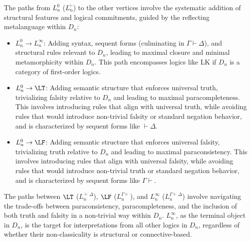 \begin{remark}
																																																																														The paths from $L^0_n$ ($L^{\vdash}_n$) to the other vertices involve the systematic addition of structural features and logical commitments, guided by the reflecting metalanguage within $D_n$:
																																																																														\begin{itemize}
																																																																															\item $L^0_n \to L^\infty_n$: Adding syntax, sequent forms (culminating in $\Gamma \vdash \Delta$), and structural rules relevant to $D_n$, leading to maximal closure and minimal metamorphicity within $D_n$. This path encompasses logics like LK if $D_n$ is a category of first-order logics.
																																																																															\item $L^0_n \to \LT$: Adding semantic structure that enforces universal truth, trivializing falsity relative to $D_n$ and leading to maximal paracompleteness. This involves introducing rules that align with universal truth, while avoiding rules that would introduce non-trivial falsity or standard negation behavior, and is characterized by sequent forms like $\vdash \Delta$.
																																																																															\item $L^0_n \to \LF$: Adding semantic structure that enforces universal falsity, trivializing truth relative to $D_n$ and leading to maximal paraconsistency. This involves introducing rules that align with universal falsity, while avoiding rules that would introduce non-trivial truth or standard negation behavior, and is characterized by sequent forms like $\Gamma \vdash$.
																																																																															\end{itemize}
																																																																																The paths between $\LT$ ($L^{\vdash\Delta}_n$), $\LF$ ($L^{\Gamma\vdash}_n$), and $L^\infty_n$ ($L^{\Gamma\vdash\Delta}_n$) involve navigating the trade-offs between paraconsistency, paracompleteness, and the inclusion of both truth and falsity in a non-trivial way within $D_n$. $L^\infty_n$, as the terminal object in $D_n$, is the target for interpretations from all other logics in $D_n$, regardless of whether their non-classicality is structural or connective-based.
																																																																																\end{remark}
																																																																																	
